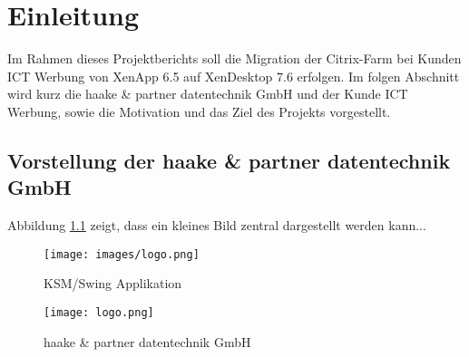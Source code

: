 
\chapter{Einleitung}
Im Rahmen dieses Projektberichts soll die Migration der Citrix-Farm bei Kunden ICT Werbung von XenApp 6.5 auf XenDesktop 7.6 erfolgen. 
Im folgen Abschnitt wird kurz die haake \& partner datentechnik GmbH und der Kunde ICT Werbung, sowie die Motivation und das Ziel des Projekts vorgestellt.

\section{Vorstellung der haake \& partner datentechnik GmbH}
Abbildung \ref{fig:ksmswing-diagramm} zeigt, dass ein kleines Bild zentral dargestellt werden kann...
\begin{figure}[ht!]
\centering
\texttt{[image: images/logo.png]}
\caption{KSM/Swing Applikation \cite{mustermann:2012}}
\label{fig:ksmswing-diagramm}
\end{figure}

% 
\begin{wrapfigure}{R}{.5\textwidth}%
\texttt{[image: logo.png]}
\vspace{-15pt}	%
\caption{haake \& partner datentechnik GmbH \cite{mustermann:2012}}
\label{fig:firmen-logo}
\end{wrapfigure}

